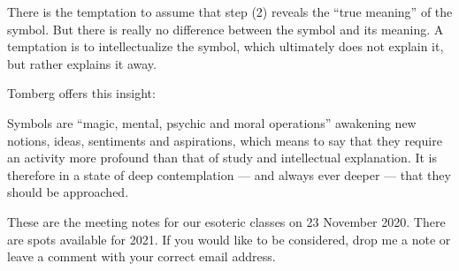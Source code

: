 There is the temptation to assume that step (2) reveals the ``true meaning'' of the symbol. But there is really no difference between the symbol and its meaning. A temptation is to intellectualize the symbol, which ultimately does not explain it, but rather explains it away.

Tomberg offers this insight:

\begin{quotex}
Symbols are ``magic, mental, psychic and moral operations'' awakening new notions, ideas, sentiments and aspirations, which means to say that they require an activity more profound than that of study and intellectual explanation. It is therefore in a state of deep contemplation --- and always ever deeper --- that they should be approached.
\end{quotex}

These are the meeting notes for our esoteric classes on 23 November 2020. There are spots available for 2021. If you would like to be considered, drop me a note or leave a comment with your correct email address.



